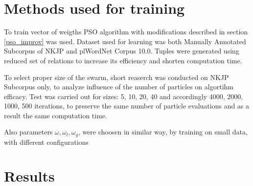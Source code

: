 \section{Methods used for training}
To train vector of weigths PSO algorithm with modifications described in section \ref{pso_improv} was used. 
Dataset used for learning was both Manually Annotated Subcorpus of NKJP and plWordNet Corpus 10.0. Tuples were generated using reduced set of relations
to increase its efficiency and shorten computation time.

To select proper size of the swarm, short reaserch was conducted on NKJP Subcorpus only, to analyze influence of the number of particles on 
algortihm efficacy. Test was carried out for sizes: 5, 10, 20, 40 and accordingly 4000, 2000, 1000, 500 iterations, 
to preserve the same number of particle evaluations and as a result the same computation time.

Also parameters \(\omega, \omega _l, \omega _g\), were choosen in similar way, by training on small data, with different configurations


\section{Results}

